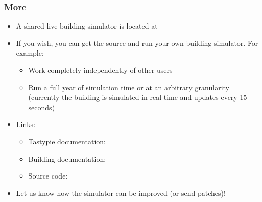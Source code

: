 \documentclass[t]{beamer}
\begin{document}
\begin{frame}
  \frametitle{More}
  
  \begin{itemize}
    \item A shared live building simulator is located at\\
    \item If you wish, you can get the source and run your own building simulator. For example:
      \begin{itemize}
        \item Work completely independently of other users
        \item Run a full year of simulation time or at an arbitrary granularity\\
              (currently the building is simulated in real-time and updates every 15 seconds)
      \end{itemize}
    \item Links:
    \begin{itemize}
      \item Tastypie documentation: \\
             
      \item Building documentation: \\
      \item Source code:  \\
    \end{itemize}
    \item Let us know how the simulator can be improved (or send patches)!
  \end{itemize}
  
\end{frame}
\end{document}
